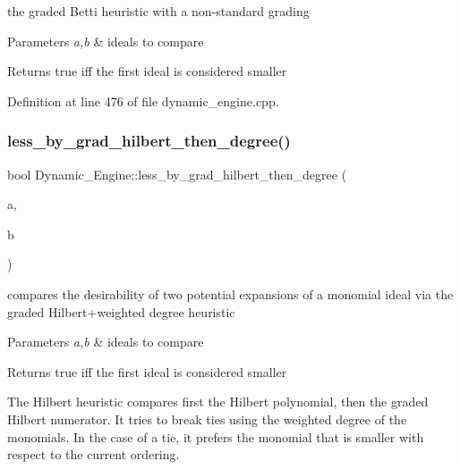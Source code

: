 the graded Betti heuristic with a non-\/standard grading 


\begin{DoxyParams}{Parameters}
{\em a,b} & ideals to compare \\
\hline
\end{DoxyParams}
\begin{DoxyReturn}{Returns}
{\ttfamily true} iff the first ideal is considered smaller 
\end{DoxyReturn}


Definition at line 476 of file dynamic\+\_\+engine.\+cpp.

\mbox{\label{namespace_dynamic___engine_a9a6525d0f50053349c5573422f025c22}} 
\subsubsection{\texorpdfstring{less\+\_\+by\+\_\+grad\+\_\+hilbert\+\_\+then\+\_\+degree()}{less\_by\_grad\_hilbert\_then\_degree()}}
{\footnotesize\ttfamily bool Dynamic\+\_\+\+Engine\+::less\+\_\+by\+\_\+grad\+\_\+hilbert\+\_\+then\+\_\+degree (\begin{DoxyParamCaption}\item[{\hyperlink{group___g_b_computation_class_dynamic___engine_1_1_p_p___with___ideal}{P\+P\+\_\+\+With\+\_\+\+Ideal} \&}]{a,  }\item[{\hyperlink{group___g_b_computation_class_dynamic___engine_1_1_p_p___with___ideal}{P\+P\+\_\+\+With\+\_\+\+Ideal} \&}]{b }\end{DoxyParamCaption})}



compares the desirability of two potential expansions of a monomial ideal via the graded Hilbert+weighted degree heuristic 


\begin{DoxyParams}{Parameters}
{\em a,b} & ideals to compare \\
\hline
\end{DoxyParams}
\begin{DoxyReturn}{Returns}
{\ttfamily true} iff the first ideal is considered smaller
\end{DoxyReturn}
The Hilbert heuristic compares first the Hilbert polynomial, then the graded Hilbert numerator. It tries to break ties using the weighted degree of the monomials. In the case of a tie, it prefers the monomial that is smaller with respect to the current ordering. 

